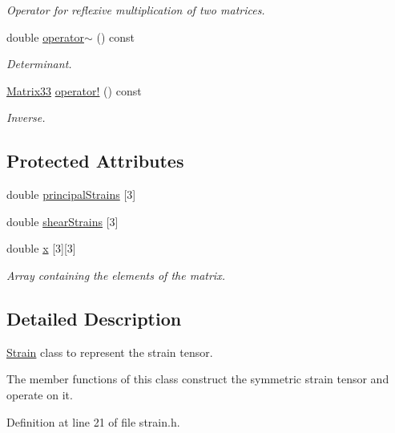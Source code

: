 \begin{DoxyCompactItemize}
\begin{DoxyCompactList}\small\item\em Operator for reflexive multiplication of two matrices. \end{DoxyCompactList}\item 
double \hyperlink{classMatrix33_a15b37caa6ab0d9f4a9f0d95846abd675}{operator$\sim$} () const 
\begin{DoxyCompactList}\small\item\em Determinant. \end{DoxyCompactList}\item 
\hyperlink{classMatrix33}{Matrix33} \hyperlink{classMatrix33_a1b822a20343a26b3c9bb7fd5c1247f37}{operator!} () const 
\begin{DoxyCompactList}\small\item\em Inverse. \end{DoxyCompactList}\end{DoxyCompactItemize}
\subsection*{Protected Attributes}
\begin{DoxyCompactItemize}
\item 
double \hyperlink{classStrain_a172c6ef4593e35bc9280a2dafde61475}{principal\-Strains} \mbox{[}3\mbox{]}
\item 
double \hyperlink{classStrain_afbc4d1b573860bda614a43f767b8b272}{shear\-Strains} \mbox{[}3\mbox{]}
\item 
double \hyperlink{classMatrix33_af7f01fa466616eb7c8eda2e4d9f85cdd}{x} \mbox{[}3\mbox{]}\mbox{[}3\mbox{]}
\begin{DoxyCompactList}\small\item\em Array containing the elements of the matrix. \end{DoxyCompactList}\end{DoxyCompactItemize}


\subsection{Detailed Description}
\hyperlink{classStrain}{Strain} class to represent the strain tensor. 

The member functions of this class construct the symmetric strain tensor and operate on it. 

Definition at line 21 of file strain.\-h.




